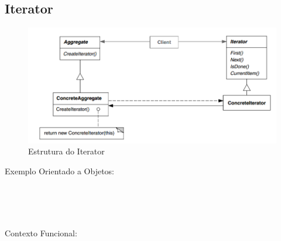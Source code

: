\subsection{Iterator}

\begin{figure}[htb]
	\caption{\label{fig_grafico}Estrutura do Iterator}
	\begin{center}
	    \includegraphics[scale=0.5]{5_padroes-contexto-funcional/5.3_comportamentais/5.3.04_iterator/diagram.png}
	\end{center}
\end{figure}

Exemplo Orientado a Objetos:

\begin{lstlisting}[caption={Iterator Orientação a Objetos},label=ooiterator]


    
\end{lstlisting}

Contexto Funcional:


\begin{lstlisting}[caption={Iterator Funcional},label=fpiterator]
    

    
\end{lstlisting}